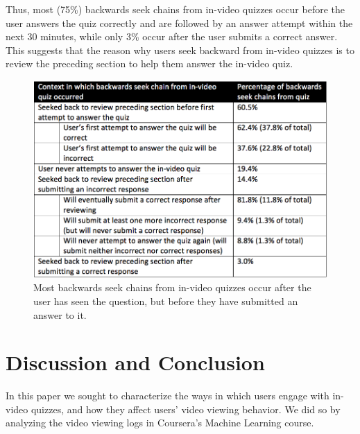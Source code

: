 \documentclass{sigchi}
\begin{document}
Thus, most (75\%) backwards seek chains from in-video quizzes occur before the user answers the quiz correctly and are followed by an answer attempt within the next 30 minutes, while only 3\% occur after the user submits a correct answer. This suggests that the reason why users seek backward from in-video quizzes is to review the preceding section to help them answer the in-video quiz.


\begin{figure}
\includegraphics[width=1.0\columnwidth]{backseeks-and-quizzes}
\caption{Most backwards seek chains from in-video quizzes occur after the user has seen the question, but before they have submitted an answer to it.}
\label{fig:backseeks-and-quizzes}
\end{figure}

\section{Discussion and Conclusion}

In this paper we sought to characterize the ways in which users engage with in-video quizzes, and how they affect users' video viewing behavior. We did so by analyzing the video viewing logs in Coursera's Machine Learning course.
\end{document}
